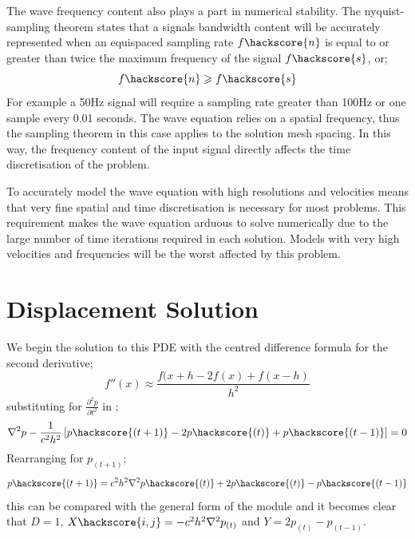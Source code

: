 The wave frequency content also plays a part in numerical stability. The
nyquist-sampling theorem states that a signals bandwidth content will be
accurately represented when an equispaced sampling rate $f \hackscore{n}$ is
equal to or greater than twice the maximum frequency of the signal
$f\hackscore{s}$, or;
\begin{equation} \label{eqn:samptheorem}
 f\hackscore{n} \geqslant f\hackscore{s}
\end{equation}
For example a 50Hz signal will require a sampling rate greater than 100Hz or
one sample every 0.01 seconds. The wave equation relies on a spatial frequency,
thus the sampling theorem in this case applies to the solution mesh spacing. In
this way, the frequency content of the input signal directly affects the time
discretisation of the problem.  

To accurately model the wave equation with high resolutions and velocities
means that very fine spatial and time discretisation is necessary for most
problems.
This requirement makes the wave equation arduous to
solve numerically due to the large number of time iterations required in each
solution. Models with very high velocities and frequencies will be the worst
affected by this problem.

\section{Displacement Solution}

We begin the solution to this PDE with the centred difference formula for the
second derivative;
\begin{equation}
 f''(x) \approx \frac{f(x+h - 2f(x) + f(x-h)}{h^2}
\label{eqn:centdiff}
\end{equation}
substituting  for $\frac{\partial ^2 p }{\partial t ^2}$
in ;
\begin{equation}
 \nabla ^2 p - \frac{1}{c^2h^2} \left[p\hackscore{(t+1)} - 2p\hackscore{(t)} +
p\hackscore{(t-1)} \right]
= 0
\label{eqn:waveu}
\end{equation}
Rearranging for $p_{(t+1)}$;
\begin{equation}
 p\hackscore{(t+1)} = c^2 h^2 \nabla ^2 p\hackscore{(t)} +2p\hackscore{(t)} -
p\hackscore{(t-1)}
\end{equation}
this can be compared with the general form of the \modLPDE module and it
becomes clear that $D=1$, $X\hackscore{i,j}=-c^2 h^2 \nabla ^2 p_{(t)}$ and
$Y=2p_{(t)} - p_{(t-1)}$.

